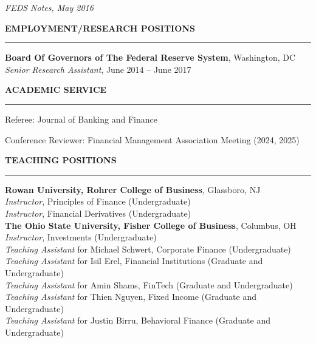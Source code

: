 \documentclass[11pt]{article}
\begin{document}
\textit{FEDS Notes, May 2016}

\bigskip

\textbf{{\Large E}{\footnotesize MPLOYMENT}/{\large R}{\footnotesize ESEARCH} {\large P}{\footnotesize OSITIONS}\vspace{-0.05in}}

\rule[5pt]{470pt}{1pt}\vspace{-0.05in}


\textbf{Board Of Governors of The Federal Reserve System}, Washington, DC\\
\textit{Senior Research Assistant}, June 2014 -- June 2017

\bigskip

\textbf{{\large A}{\footnotesize CADEMIC} {\large S}{\footnotesize ERVICE}}

\rule[5pt]{470pt}{1pt}\vspace{-0.05in}

Referee: Journal of Banking and Finance

\vspace{.1in}

Conference Reviewer: Financial Management Association Meeting (2024, 2025)

\bigskip

\textbf{{\large T}{\footnotesize EACHING} {\large P}{\footnotesize OSITIONS}\vspace{-0.05in}}

\rule[5pt]{470pt}{1pt}\vspace{0.025in}

\textbf{Rowan University, Rohrer College of Business}, Glassboro, NJ\\
\textit{Instructor}, Principles of Finance (Undergraduate) \\
\textit{Instructor}, Financial Derivatives (Undergraduate) \\

\textbf{The Ohio State University, Fisher College of Business}, Columbus, OH\\
\textit{Instructor}, Investments (Undergraduate) \\
\textit{Teaching Assistant} for Michael Schwert, Corporate Finance (Undergraduate)\\
\textit{Teaching Assistant} for Isil Erel, Financial Institutions (Graduate and Undergraduate) \\
\textit{Teaching Assistant} for Amin Shams, FinTech (Graduate and Undergraduate) \\
\textit{Teaching Assistant} for Thien Nguyen, Fixed Income (Graduate and Undergraduate) \\
\textit{Teaching Assistant} for Justin Birru, Behavioral Finance (Graduate and Undergraduate) \\








\end{document}
